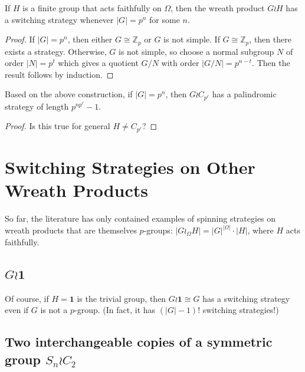 \begin{corollary}
  If $H$ is a finite group that acts faithfully on $\Omega$, then the wreath product
  $G \wr H$ has a switching strategy whenever $|G| = p^n$ for some $n$.
\end{corollary}
\begin{proof}
  If $|G| = p^n$, then either $G \cong \mathbb{Z}_p$ or $G$ is not simple.
  If $G \cong \mathbb{Z}_p$, then there exists a strategy. Otherwise,
  $G$ is not simple, so choose a normal subgroup $N$ of order $|N| = p^t$
  which gives a quotient $G/N$ with order $|G/N| = p^{n-t}$. Then the
  result follows by induction.
\end{proof}
\begin{corollary}
  Based on the above construction, if $|G| = p^n$, then $G \wr C_{p^\ell}$
  has a palindromic strategy of length $p^{n p^\ell}-1$.
\end{corollary}
\begin{proof}
  Is this true for general $H \neq C_{p^\ell}$?
\end{proof}

%
%
\section{Switching Strategies on Other Wreath Products}
\label{sec:OtherSwitchingStrategies}

So far, the literature has only contained examples of spinning strategies on
wreath products that are themselves $p$-groups:
$|G \wr_\Omega H| = |G|^{|\Omega|} \cdot |H|$, where $H$ acts faithfully.

\subsection{\texorpdfstring{$G \wr \mathbf{1}$}{The trivial wreath product}}

Of course, if $H = \textbf{1}$ is the trivial group, then
$G \wr \mathbf{1} \cong G$ has a switching strategy even if $G$ is not a $p$-group.
(In fact, it has $(|G|-1)!$ switching strategies!)

\subsection{Two interchangeable copies of a symmetric group \texorpdfstring{$S_n \wr C_2$}{Sn wr C2}}

